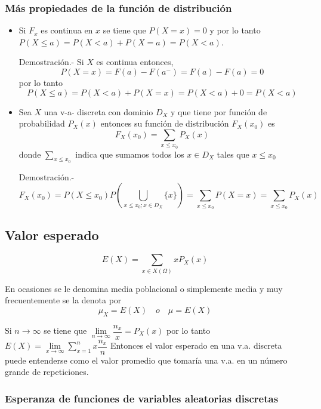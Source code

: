 \documentclass[
]{article}
\begin{document}
\hypertarget{muxe1s-propiedades-de-la-funciuxf3n-de-distribuciuxf3n}{%
\subsubsection{Más propiedades de la función de
distribución}\label{muxe1s-propiedades-de-la-funciuxf3n-de-distribuciuxf3n}}

\begin{itemize}
\item Si $F_x$ es continua en $x$ se tiene que $P(X=x) = 0$ y por lo tanto $P(X\leq a) = P(X<a) + P(X=a) = P(X<a)$.

Demostración.- Si $X$ es continua entonces,
$$P(X=x) = F(a) - F(a^-) = F(a) - F(a) = 0$$
por lo tanto 
$$P(X\leq a) = P(X<a) + P(X=x) = P(X<a) + 0 = P(X<a)$$
\item Sea $X$ una v-a- discreta con dominio $D_X$ y que tiene por función de probabilidad $P_X(x)$ entonces su función de distribución $F_X(x_0)$ es 
$$F_X(x_0) = \sum_{x\leq x_0} P_X(x)$$
donde $\sum\limits_{x\leq x_0}$ indica que sumamos todos los $x\in D_X$ tales que $x\leq x_0$

Demostración.- 
$$F_X(x_0) = P(X\leq x_0) P\left(\bigcup_{x\leq x_0; x\in D_X} \lbrace x \rbrace \right) = \sum_{x\leq x_0}P(X=x)=  \sum_{x\leq x_0} P_X(x)$$
\end{itemize}

\hypertarget{valor-esperado}{%
\subsection{Valor esperado}\label{valor-esperado}}

\[E(X)=\sum_{x\in X(\Omega)} x P_X(x)\]

En ocasiones se le denomina media poblacional o simplemente media y muy
frecuentemente se la denota por
\[\mu_X = E(X) \quad o \quad \mu = E(X)\]

Si \({n\to \infty}\) se tiene que
\(\lim\limits_{n\to \infty} \dfrac{n_x}{x} = P_X(x)\) por lo tanto
\(E(X) = \lim\limits_{x\to \infty}\sum\limits_{x=1}^n x\dfrac{n_x}{n}\)
Entonces el valor esperado en una v.a. discreta puede entenderse como el
valor promedio que tomaría una v.a. en un número grande de repeticiones.

\hypertarget{esperanza-de-funciones-de-variables-aleatorias-discretas}{%
\subsubsection{Esperanza de funciones de variables aleatorias
discretas}\label{esperanza-de-funciones-de-variables-aleatorias-discretas}}
\end{document}
